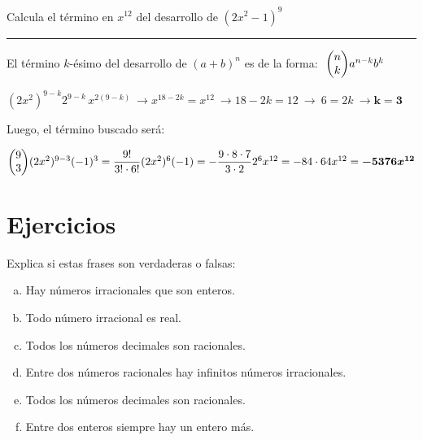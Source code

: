 \begin{miejercicio}

Calcula el término en $x^{12}$ del desarrollo de $(2x^2-1)^9$	

\rule{300pt}{0.1pt}

El término $k$-ésimo del desarrollo de $(a+b)^n$ es de la forma: $\  \mqty(n\\k) a^{n-k}b^k$

$(2x^2)^{9-k}2^{9-k}\, x^{2(9-k)} \ \to x^{18-2k}=x^{12} \ \to  18-2k=12 \ \to \ 6=2k \ \to \boldsymbol{k=3}$

Luego, el término buscado será:

$\mqty(9\\3)(2x^2)^{9-3}(-1)^3=\dfrac{9!}{3!\cdot 6!}(2x^2)^6(-1)=-\dfrac{9\cdot 8\cdot 7}{3\cdot 2} 2^6 x^{12} =-84\cdot 64x^{12}=\boldsymbol{ -5376x^{12} }$
\end{miejercicio}






\vspace{1cm}
\section{Ejercicios}
\vspace{0.5cm}


\begin{mipropuesto}

Explica si estas frases son verdaderas o falsas:

\begin{enumerate}[a) ]
\item Hay números irracionales que son enteros.

\item Todo número irracional es real.

\item Todos los números decimales son racionales.

\item Entre dos números racionales hay infinitos números irracionales.

\item Todos los números decimales son racionales.

\item Entre dos enteros siempre hay un entero más.	
\end{enumerate}
\end{mipropuesto}

